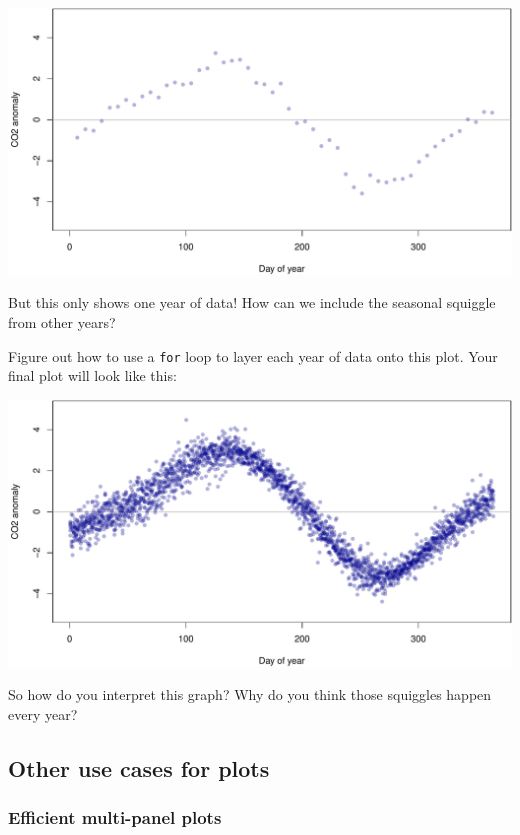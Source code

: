 \documentclass[]{book}
\begin{document}
\includegraphics{figures/unnamed-chunk-553-1.pdf}

But this only shows one year of data! How can we include the seasonal squiggle from other years?

Figure out how to use a \texttt{for} loop to layer each year of data onto this plot. Your final plot will look like this:

\includegraphics{figures/unnamed-chunk-554-1.pdf}

So how do you interpret this graph? Why do you think those squiggles happen every year?

\hypertarget{other-use-cases-for-plots}{%
\subsection*{Other use cases for plots}\label{other-use-cases-for-plots}}

\hypertarget{efficient-multi-panel-plots}{%
\subsubsection*{Efficient multi-panel plots}\label{efficient-multi-panel-plots}}
\end{document}
